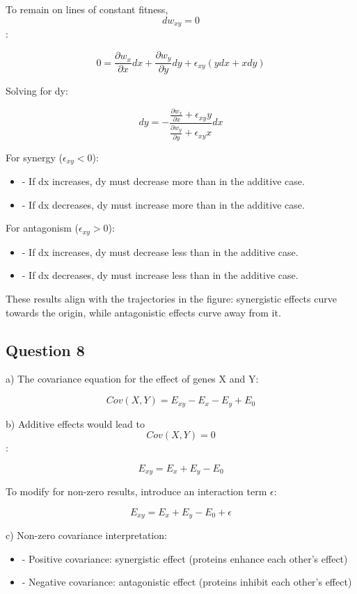 \documentclass{article}
\begin{document}
To remain on lines of constant fitness, $$dw_{xy} = 0$$:

$$0 = \frac{\partial w_x}{\partial x} dx + \frac{\partial w_y}{\partial y} dy + \epsilon_{xy} (y dx + x dy)$$

Solving for dy:

$$dy = -\frac{\frac{\partial w_x}{\partial x} + \epsilon_{xy}y}{\frac{\partial w_y}{\partial y} + \epsilon_{xy}x} dx$$

For synergy ($\epsilon_{xy} < 0$):
\begin{itemize}
    \item - If dx increases, dy must decrease more than in the additive case.
    \item - If dx decreases, dy must increase more than in the additive case.
\end{itemize}

For antagonism ($\epsilon_{xy} > 0$):
\begin{itemize}
    \item - If dx increases, dy must decrease less than in the additive case.
    \item - If dx decreases, dy must increase less than in the additive case.
\end{itemize}

These results align with the trajectories in the figure: synergistic effects curve towards the origin, while antagonistic effects curve away from it.

\subsection{Question 8}

a) The covariance equation for the effect of genes X and Y:

$$Cov(X,Y) = E_{xy} - E_x - E_y + E_0$$

b) Additive effects would lead to $$Cov(X,Y) = 0$$:

$$E_{xy} = E_x + E_y - E_0$$

To modify for non-zero results, introduce an interaction term $\epsilon$:

$$E_{xy} = E_x + E_y - E_0 + \epsilon$$

c) Non-zero covariance interpretation:
\begin{itemize}
    \item - Positive covariance: synergistic effect (proteins enhance each other's effect)
    \item - Negative covariance: antagonistic effect (proteins inhibit each other's effect)
\end{itemize}
\end{document}
